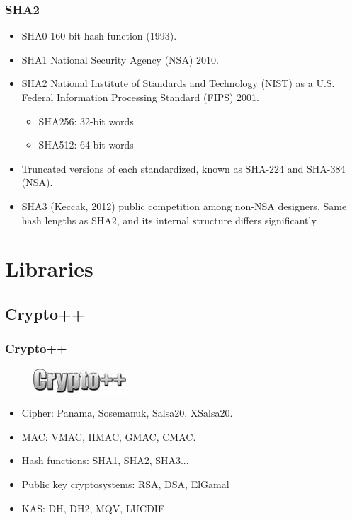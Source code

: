 \documentclass{beamer}
\begin{document}
\begin{frame}
\frametitle{SHA2}
\begin{itemize}
\item SHA0 160-bit hash function (1993).
\item SHA1 National Security Agency (NSA) 2010.
\item SHA2 National Institute of Standards and Technology (NIST) as a U.S. Federal Information Processing Standard (FIPS) 2001.
\begin{itemize}
\item SHA256: 32-bit words
\item SHA512: 64-bit words
\end{itemize}
\item Truncated versions of each standardized, known as SHA-224 and SHA-384 (NSA).
\item SHA3 (Keccak, 2012) public competition among non-NSA designers. Same hash lengths as SHA2, and its internal structure differs significantly.
\end{itemize}
\end{frame}

\section{Libraries}

\subsection{Crypto++}

\begin{frame}
\frametitle{Crypto++}
\begin{figure}
\includegraphics[width=0.2\linewidth]{crypto.jpg}
\end{figure}
\begin{itemize}
\item Cipher: Panama, Sosemanuk, Salsa20, XSalsa20.
\item MAC: VMAC, HMAC, GMAC, CMAC.
\item Hash functions: SHA1, SHA2, SHA3...
\item Public key cryptosystems: RSA, DSA, ElGamal
\item KAS: DH, DH2, MQV, LUCDIF
\end{itemize}
\end{frame}
\end{document}

